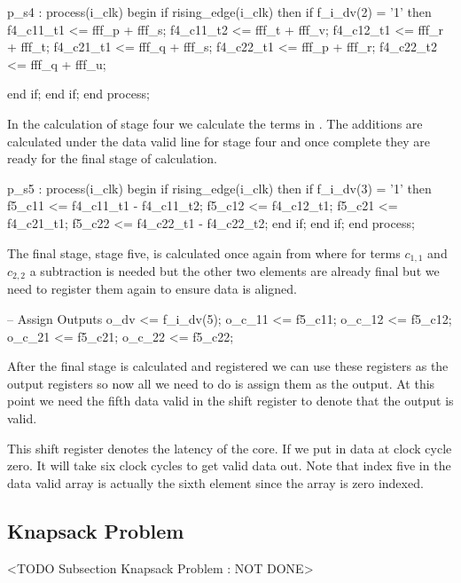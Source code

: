 \begin{VHDLlisting}[tabsize]
p_s4 : process(i_clk)
begin
	if rising_edge(i_clk) then
		if f_i_dv(2) = '1' then
			f4_c11_t1 <= fff_p + fff_s;
		    f4_c11_t2 <= fff_t + fff_v;
		    f4_c12_t1 <= fff_r + fff_t;
		    f4_c21_t1 <= fff_q + fff_s;
		    f4_c22_t1 <= fff_p + fff_r;
		    f4_c22_t2 <= fff_q + fff_u;
		
		end if;
	end if;
end process;
\end{VHDLlisting}

In the calculation of stage four we calculate the terms in . The additions are calculated under the data valid line for stage four and once complete they are ready for the final stage of calculation. 

\begin{VHDLlisting}[tabsize=2]
p_s5 : process(i_clk)
begin
	if rising_edge(i_clk) then
		if f_i_dv(3) = '1' then
			f5_c11 <= f4_c11_t1 - f4_c11_t2;
		    f5_c12 <= f4_c12_t1;
		    f5_c21 <= f4_c21_t1;
		    f5_c22 <= f4_c22_t1 - f4_c22_t2;
		end if;
	end if;
end process;
\end{VHDLlisting} 

The final stage, stage five, is calculated once again from  where for terms $c_{1,1}$ and $c_{2,2}$ a subtraction is needed but the other two elements are already final but we need to register them again to ensure data is aligned. 

\begin{VHDLlisting}[tabsize=2]
-- Assign Outputs
o_dv   <= f_i_dv(5);
o_c_11 <= f5_c11;
o_c_12 <= f5_c12;
o_c_21 <= f5_c21;
o_c_22 <= f5_c22;
\end{VHDLlisting}

After the final stage is calculated and registered we can use these registers as the output registers so now all we need to do is assign them as the output. At this point we need the fifth data valid in the shift register to denote that the output is valid. 

This shift register denotes the latency of the core. If we put in data at clock cycle zero. It will take six clock cycles to get valid data out. Note that index five in the data valid array is actually the sixth element since the array is zero indexed. 

\subsection{Knapsack Problem}
	<TODO Subsection Knapsack Problem : NOT DONE>

